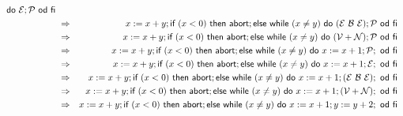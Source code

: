 \begin{small}
\begin{eqnarray*}
\ \DO\ \mathcal{E};\mathcal{P}\ \OD\ \FI\ \\
% 
&\Rightarrow & x:=x + y; \IF\ (x < 0)\ \THEN\ \ABORT; \ELSE\ \WHILE\ (x\neq y)
\ \DO\ (\mathcal{E}\ \mathcal{B}\ \mathcal{E});\mathcal{P}\ \OD\ \FI\ \\
% 
&\Rightarrow & x:=x + y; \IF\ (x < 0)\ \THEN\ \ABORT; \ELSE\ \WHILE\ (x\neq y)
\ \DO\ (\mathcal{V}+\mathcal{N});\mathcal{P}\ \OD\ \FI\ \\
% 
&\Rightarrow & x:=x + y; \IF\ (x < 0)\ \THEN\ \ABORT; \ELSE\ \WHILE\ (x\neq y)
\ \DO\ x := x + 1;\mathcal{P};\ \OD\ \FI\ \\
% 
&\Rightarrow & x:=x + y; \IF\ (x < 0)\ \THEN\ \ABORT; \ELSE\ \WHILE\ (x\neq y)
\ \DO\ x := x + 1;\mathcal{E};\ \OD\ \FI\ \\
% 
&\Rightarrow & x:=x + y; \IF\ (x < 0)\ \THEN\ \ABORT; \ELSE\ \WHILE\ (x\neq y)
\ \DO\ x := x + 1;(\mathcal{E}\ \mathcal{B}\ \mathcal{E});\ \OD\ \FI\ \\
% 
&\Rightarrow & x:=x + y; \IF\ (x < 0)\ \THEN\ \ABORT; \ELSE\ \WHILE\ (x\neq y)\ \DO
\ x := x + 1;(\mathcal{V} +\mathcal{N});\ \OD\ \FI\ \\
% 
&\Rightarrow & x:=x + y; \IF\ (x < 0)\ \THEN\ \ABORT; \ELSE\ \WHILE\ (x\neq y)\ \DO
\ x := x + 1;y := y + 2;\ \OD\ \FI\ \\
&&
\end{eqnarray*}

\end{small}
